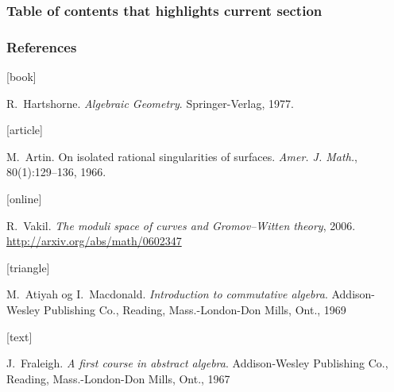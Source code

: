 \documentclass{beamer}
\begin{document}
\begin{frame}
  \frametitle{Table of contents that highlights current section}

  \tableofcontents[currentsection]

\end{frame}

\begin{frame}[allowframebreaks]
  \frametitle{References}

  \begin{thebibliography}{}

      [book]

      R.~Hartshorne.
      \newblock \emph{Algebraic Geometry}.
      \newblock Springer-Verlag, 1977.

      [article]

      M.~Artin.
      \newblock On isolated rational singularities of surfaces.
      \newblock \emph{Amer. J. Math.}, 80(1):129--136, 1966.

      [online]

      R.~Vakil.
      \newblock \emph{The moduli space of curves and Gromov--Witten theory}, 2006.
      \newblock \url{http://arxiv.org/abs/math/0602347}

      [triangle]

      M.~Atiyah og I.~Macdonald.
      \newblock \emph{Introduction to commutative algebra}.
      \newblock Addison-Wesley Publishing Co., Reading, Mass.-London-Don
      Mills, Ont., 1969

      [text]

      J.~Fraleigh.
      \newblock \emph{A first course in abstract algebra}.
      \newblock Addison-Wesley Publishing Co., Reading, Mass.-London-Don Mills, Ont., 1967

  \end{thebibliography}
\end{frame}
\end{document}
